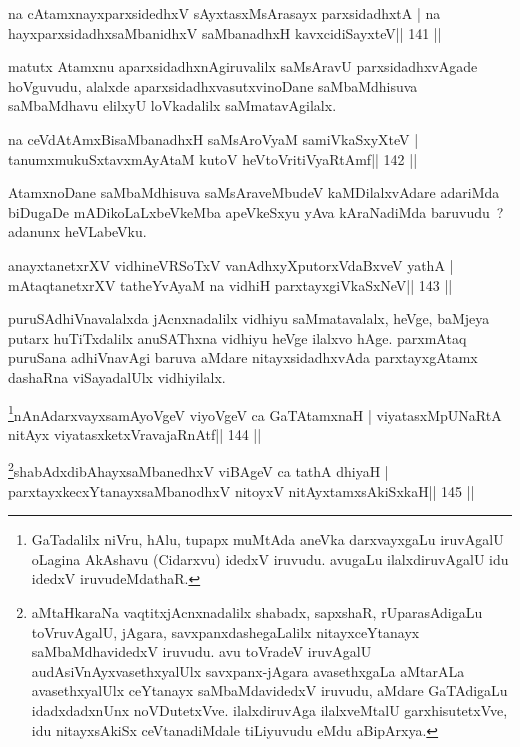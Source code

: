 \begin{shl}
na cA\s\s tamxnayxparxsidedhxV sAyxtasxMsArasayx parxsidadhxtA |
na hayxparxsidadhxsaMbanidhxV saMbanadhxH kavxcidiSayxteV\hfill || 141 ||
\end{shl}

\begin{artha}
matutx Atamxnu aparxsidadhxnAgiruvalilx saMsAravU parxsidadhxvAgade hoVguvudu, alalxde aparxsidadhxvasutxvinoDane saMbaMdhisuva saMbaMdhavu elilxyU loVkadalilx saMmatavAgilalx.
\end{artha}

\begin{shl}
na ceVdAtAmxBisaMbanadhxH saMsAroV\s yaM samiVkaSxyXteV |
tanumxmukuSxtavxmAyAtaM kutoV heVtoVritiVyaRtAmf\hfill || 142 ||
\end{shl}

\begin{artha}
AtamxnoDane saMbaMdhisuva saMsAraveMbudeV kaMDilalxvAdare adariMda biDugaDe mADikoLaLxbeVkeMba apeVkeSxyu yAva kAraNadiMda baruvudu~? adanunx heVLabeVku.
\end{artha}


\begin{shl}
anayxtanetxrXV vidhineVRSoTxV vanAdhxyXputorxVdaBxveV yathA |
mAtaqtanetxrXV tatheYvAyaM na vidhiH parxtayxgiVkaSxNeV\hfill || 143 ||
\end{shl}

\begin{artha}
puruSAdhiVnavalalxda jAcnxnadalilx vidhiyu saMmatavalalx, heVge, baMjeya putarx huTiTxdalilx anuSAThxna vidhiyu heVge ilalxvo hAge. parxmAtaq puruSana adhiVnavAgi baruva aMdare nitayxsidadhxvAda parxtayxgAtamx dashaRna viSayadalUlx vidhiyilalx.
\end{artha}


\begin{shl}
\footnote{GaTadalilx niVru, hAlu, tupapx muMtAda aneVka darxvayxgaLu iruvAgalU oLagina AkAshavu (Cidarxvu) idedxV iruvudu. avugaLu ilalxdiruvAgalU idu idedxV iruvudeMdathaR.}nAnAdarxvayxsamAyoVgeV viyoVgeV ca GaTAtamxnaH |
viyatasxMpUNaRtA nitAyx viyatasxketxVravajaRnAtf\hfill || 144 ||
\end{shl}

\begin{shl}
\footnote{aMtaHkaraNa vaqtitxjAcnxnadalilx shabadx, sapxshaR, rUparasAdigaLu toVruvAgalU, jAgara, savxpanxdashegaLalilx nitayxceYtanayx saMbaMdhavidedxV iruvudu. avu toVradeV iruvAgalU audAsiVnAyxvasethxyalUlx savxpanx-jAgara avasethxgaLa aMtarALa avasethxyalUlx ceYtanayx saMbaMdavidedxV iruvudu, aMdare GaTAdigaLu idadxdadxnUnx noVDutetxVve. ilalxdiruvAga ilalxveMtalU garxhisutetxVve, idu nitayxsAkiSx ceVtanadiMdale tiLiyuvudu eMdu aBipArxya.}shabAdxdibAhayxsaMbanedhxV viBAgeV ca tathA dhiyaH |
parxtayxkecxYtanayxsaMbanodhxV nitoyxV nitAyxtamxsAkiSxkaH\hfill || 145 ||
\end{shl}

